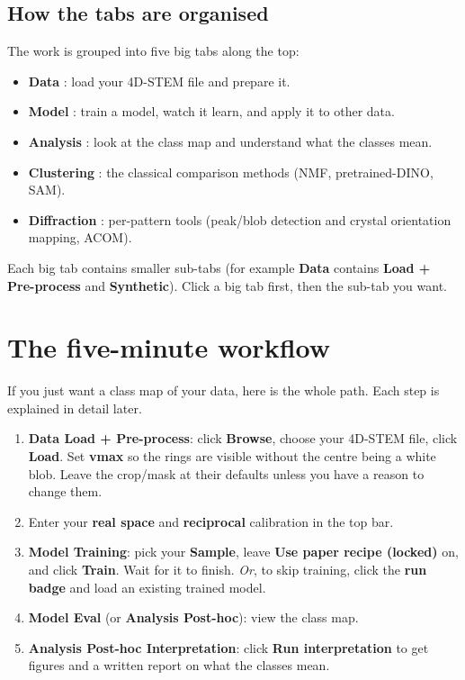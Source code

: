 \documentclass[11pt]{article}
\newcommand{\btn}[1]{\textbf{#1}}
\newcommand{\tab}[1]{\textsf{\textbf{#1}}}
\begin{document}
\subsection{How the tabs are organised}
The work is grouped into five big tabs along the top:
\begin{itemize}[itemsep=2pt]
\item \tab{Data} : load your 4D-STEM file and prepare it.
\item \tab{Model} : train a model, watch it learn, and apply it to other data.
\item \tab{Analysis} : look at the class map and understand what the classes mean.
\item \tab{Clustering} : the classical comparison methods (NMF, pretrained-DINO, SAM).
\item \tab{Diffraction} : per-pattern tools (peak/blob detection and crystal
orientation mapping, ACOM).
\end{itemize}
Each big tab contains smaller sub-tabs (for example \tab{Data} contains
\tab{Load + Pre-process} and \tab{Synthetic}). Click a big tab first, then the
sub-tab you want.

\section{The five-minute workflow}
If you just want a class map of your data, here is the whole path. Each step is
explained in detail later.
\begin{enumerate}[itemsep=3pt]
\item \tab{Data \textrightarrow{} Load + Pre-process}: click \btn{Browse}, choose
your 4D-STEM file, click \btn{Load}. Set \textbf{vmax} so the rings are visible
without the centre being a white blob. Leave the crop/mask at their defaults
unless you have a reason to change them.
\item Enter your \textbf{real space} and \textbf{reciprocal} calibration in the top
bar.
\item \tab{Model \textrightarrow{} Training}: pick your \textbf{Sample}, leave
\textbf{Use paper recipe (locked)} on, and click \btn{Train}. Wait for it to
finish. \emph{Or}, to skip training, click the \textbf{run badge} and load an
existing trained model.
\item \tab{Model \textrightarrow{} Eval} (or \tab{Analysis \textrightarrow{}
Post-hoc}): view the class map.
\item \tab{Analysis \textrightarrow{} Post-hoc \textrightarrow{} Interpretation}:
click \btn{Run interpretation} to get figures and a written report on what the
classes mean.
\end{enumerate}
\end{document}
